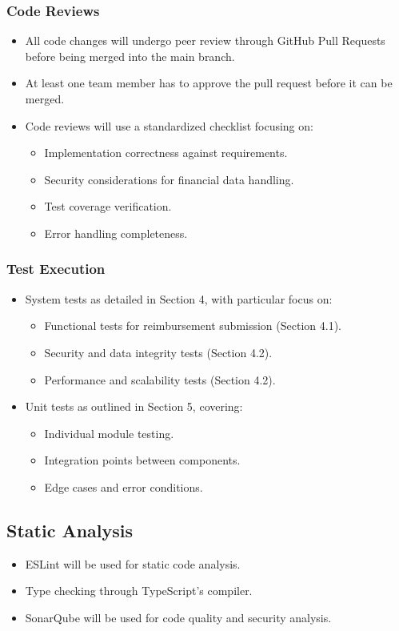 \documentclass[12pt, titlepage]{article}
\begin{document}
\subsubsection*{Code Reviews}
\begin{itemize}
  \item All code changes will undergo peer review through GitHub Pull Requests before being merged into the main branch.
  \item At least one team member has to approve the pull request before it can be merged.
  \item Code reviews will use a standardized checklist focusing on:
  \begin{itemize}
    \item Implementation correctness against requirements.
    \item Security considerations for financial data handling.
    \item Test coverage verification.
    \item Error handling completeness.
  \end{itemize}
\end{itemize}

\subsubsection*{Test Execution}
\begin{itemize}
  \item System tests as detailed in Section 4, with particular focus on:
  \begin{itemize}
    \item Functional tests for reimbursement submission (Section 4.1).
    \item Security and data integrity tests (Section 4.2).
    \item Performance and scalability tests (Section 4.2).
  \end{itemize}
  \item Unit tests as outlined in Section 5, covering:
  \begin{itemize}
    \item Individual module testing.
    \item Integration points between components.
    \item Edge cases and error conditions.
  \end{itemize}
\end{itemize}

\subsection*{Static Analysis}
\begin{itemize}
  \item ESLint will be used for static code analysis.
  \item Type checking through TypeScript's compiler.
  \item SonarQube will be used for code quality and security analysis.
\end{itemize}
\end{document}

